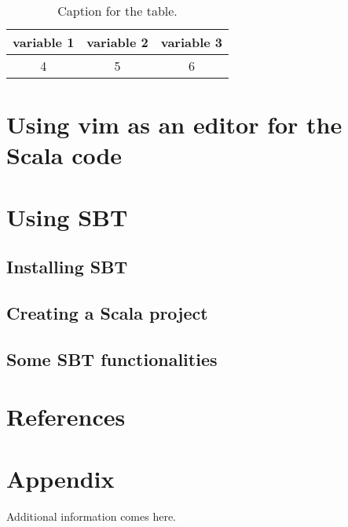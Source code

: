 \documentclass{article}
\begin{document}
\begin{table}[h!]
\centering
\caption{Caption for the table.}
\label{tab: table2}
\begin{tabular}{ccc}
\toprule

variable 1 & variable 2 & variable 3 \\

\midrule

4 & 5 & 6 \\


\bottomrule
\end{tabular}
\end{table}


\section{Using vim as an editor for the Scala code}
\section{Using SBT}
\subsection{Installing SBT}
\subsection{Creating a Scala project}
\subsection{Some SBT functionalities}
\section{References}



\section{Appendix}
\begin{appendix}

Additional information comes here.
\listoffigures
\listoftables

\end{appendix}

  
\end{document}
